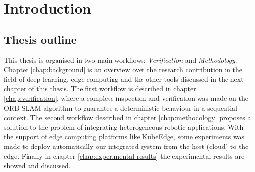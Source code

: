 \chapter{Introduction} 

\section{Thesis outline}
This thesis is organised in two main workflows: \textit{Verification} and \textit{Methodology}.
Chapter \ref{chap:background} is an overview over the research contribution in the field of  deep learning, edge computing and the other tools discussed in the next chapter of this thesis.
The first workflow is described in chapter \ref{chap:verification}, where a complete inspection and verification was made on the ORB SLAM algorithm to guarantee a deterministic behaviour in a sequential context.
The second workflow described in chapter \ref{chap:methodology} proposes a solution to the problem of integrating heterogeneous robotic applications.
With the support of edge computing platforms like KubeEdge, some experiments was made to deploy automatically our integrated system from the host (cloud) to the edge.
Finally in chapter \ref{chap:experimental-results} the experimental results are showed and discussed.



\thispagestyle{empty}
